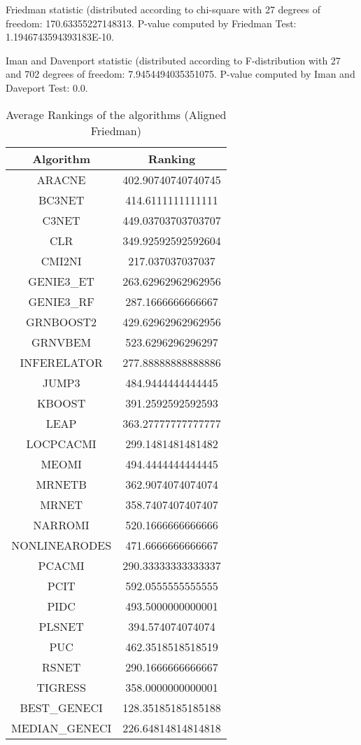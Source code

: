 \documentclass[a4paper,10pt]{article}
\begin{document}
\begin{landscape}
Friedman statistic (distributed according to chi-square with 27 degrees of freedom: 170.63355227148313. 
P-value computed by Friedman Test: 1.1946743594393183E-10.\newline

Iman and Davenport statistic (distributed according to F-distribution with 27 and 702 degrees of freedom: 7.9454494035351075. 
P-value computed by Iman and Daveport Test: 0.0.\newline


\newpage

\begin{table}[!htp]
\centering
\caption{Average Rankings of the algorithms (Aligned Friedman)
}\begin{tabular}{c|c}
Algorithm&Ranking\\
\hline
ARACNE&402.90740740740745\\
BC3NET&414.6111111111111\\
C3NET&449.03703703703707\\
CLR&349.92592592592604\\
CMI2NI&217.037037037037\\
GENIE3_ET&263.62962962962956\\
GENIE3_RF&287.1666666666667\\
GRNBOOST2&429.62962962962956\\
GRNVBEM&523.6296296296297\\
INFERELATOR&277.88888888888886\\
JUMP3&484.9444444444445\\
KBOOST&391.2592592592593\\
LEAP&363.27777777777777\\
LOCPCACMI&299.1481481481482\\
MEOMI&494.4444444444445\\
MRNETB&362.9074074074074\\
MRNET&358.7407407407407\\
NARROMI&520.1666666666666\\
NONLINEARODES&471.6666666666667\\
PCACMI&290.33333333333337\\
PCIT&592.0555555555555\\
PIDC&493.5000000000001\\
PLSNET&394.574074074074\\
PUC&462.3518518518519\\
RSNET&290.1666666666667\\
TIGRESS&358.0000000000001\\
BEST_GENECI&128.35185185185188\\
MEDIAN_GENECI&226.64814814814818\\
\end{tabular}
\end{table}



\end{landscape}
\end{document}
